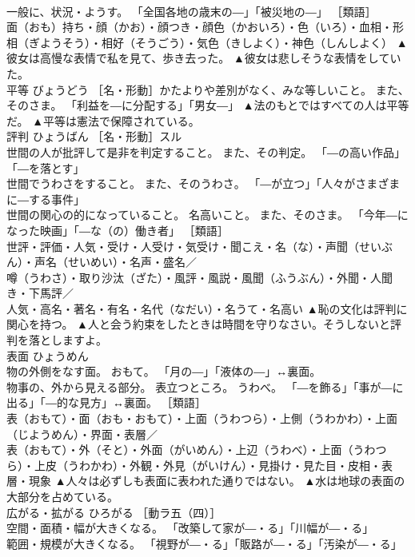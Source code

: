 \documentclass[8pt]{extreport}
\begin{document}
\begin{CJK}{UTF8}{min}
\\	一般に、状況・ようす。 「全国各地の歳末の―」「被災地の―」 ［類語］
\\	面（おも）持ち・顔（かお）・顔つき・顔色（かおいろ）・色（いろ）・血相・形相（ぎようそう）・相好（そうごう）・気色（きしよく）・神色（しんしよく）	▲彼女は高慢な表情で私を見て、歩き去った。 ▲彼女は悲しそうな表情をしていた。
\\	平等	びょうどう	［名・形動］かたよりや差別がなく、みな等しいこと。 また、そのさま。 「利益を―に分配する」「男女―」	▲法のもとではすべての人は平等だ。 ▲平等は憲法で保障されている。
\\	評判	ひょうばん	［名・形動］スル 
\\	世間の人が批評して是非を判定すること。 また、その判定。 「―の高い作品」「―を落とす」 
\\	世間でうわさをすること。 また、そのうわさ。 「―が立つ」「人々がさまざまに―する事件」 
\\	世間の関心の的になっていること。 名高いこと。 また、そのさま。 「今年―になった映画」「―な（の）働き者」 ［類語］
\\	世評・評価・人気・受け・人受け・気受け・聞こえ・名（な）・声聞（せいぶん）・声名（せいめい）・名声・盛名／
\\	噂（うわさ）・取り沙汰（ざた）・風評・風説・風聞（ふうぶん）・外聞・人聞き・下馬評／
\\	人気・高名・著名・有名・名代（なだい）・名うて・名高い	▲恥の文化は評判に関心を持つ。 ▲人と会う約束をしたときは時間を守りなさい。そうしないと評判を落としますよ。
\\	表面	ひょうめん	
\\	物の外側をなす面。 おもて。 「月の―」「液体の―」↔裏面。 
\\	物事の、外から見える部分。 表立つところ。 うわべ。 「―を飾る」「事が―に出る」「―的な見方」↔裏面。 ［類語］
\\	表（おもて）・面（おも・おもて）・上面（うわつら）・上側（うわかわ）・上面（じようめん）・界面・表層／
\\	表（おもて）・外（そと）・外面（がいめん）・上辺（うわべ）・上面（うわつら）・上皮（うわかわ）・外観・外見（がいけん）・見掛け・見た目・皮相・表層・現象	▲人々は必ずしも表面に表われた通りではない。 ▲水は地球の表面の大部分を占めている。
\\	広がる・拡がる	ひろがる	［動ラ五（四）］ 
\\	空間・面積・幅が大きくなる。 「改築して家が―・る」「川幅が―・る」 
\\	範囲・規模が大きくなる。 「視野が―・る」「販路が―・る」「汚染が―・る」 

\end{CJK}
\end{document}
